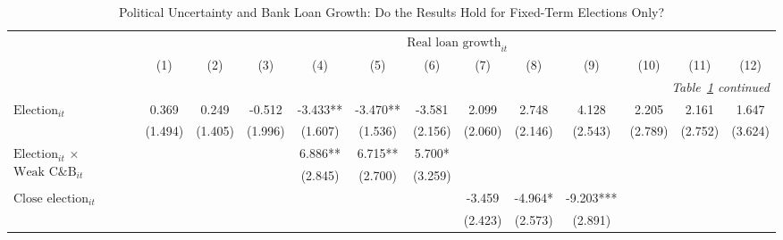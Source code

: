 \begin{longtable}{m{4.5cm}*{12}{c}}                                         \caption{Political Uncertainty and Bank Loan Growth: Do the Results Hold for Fixed-Term Elections Only?\label{robustloansfixed1}}\\                                         \toprule                                         &\multicolumn{12}{c}{$\text{Real loan growth}_{it}$} \\ \cmidrule(lr){2-13}
                    &         (1)   &         (2)   &         (3)   &         (4)   &         (5)   &         (6)   &         (7)   &         (8)   &         (9)   &        (10)   &        (11)   &        (12)   \\
\midrule\endfirsthead                                         \multicolumn{13}{r}{\textit{Table~\ref{robustloansfixed1} continued}} \\                                         \toprule\endhead\midrule\endfoot\endlastfoot
$\text{Election}_{it}$&       0.369   &       0.249   &      -0.512   &      -3.433** &      -3.470** &      -3.581   &       2.099   &       2.748   &       4.128   &       2.205   &       2.161   &       1.647   \\
                    &     (1.494)   &     (1.405)   &     (1.996)   &     (1.607)   &     (1.536)   &     (2.156)   &     (2.060)   &     (2.146)   &     (2.543)   &     (2.789)   &     (2.752)   &     (3.624)   \\
\multirow{2}{4.5cm}{$\text{Election}_{it}$ $\times$ $\text{Weak C\&B}_{it}$}&               &               &               &       6.886** &       6.715** &       5.700*  &               &               &               &               &               &               \\
                    &               &               &               &     (2.845)   &     (2.700)   &     (3.259)   &               &               &               &               &               &               \\
\multirow{2}{4.5cm}{$\text{Close election}_{it}$}&               &               &               &               &               &               &      -3.459   &      -4.964*  &      -9.203***&               &               &               \\
                    &               &               &               &               &               &               &     (2.423)   &     (2.573)   &     (2.891)   &               &               &               \\

\end{longtable}

